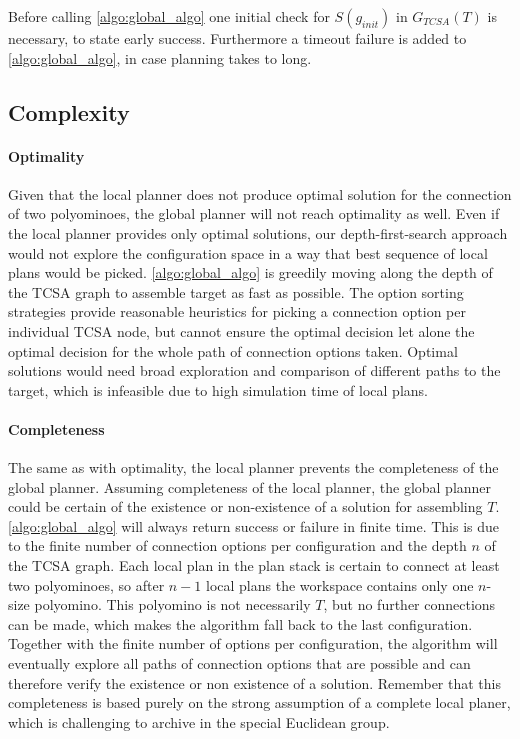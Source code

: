 Before calling \autoref{algo:global_algo} one initial check for $S(g_{init})$ in $G_{TCSA}(T)$ is necessary, to state early success.
Furthermore a timeout failure is added to \autoref{algo:global_algo}, in case planning takes to long.
 
\subsection{Complexity}

\paragraph{Optimality}

Given that the local planner does not produce optimal solution for the connection of two polyominoes, the global planner will not reach optimality as well.
Even if the local planner provides only optimal solutions, our depth-first-search approach would not explore the configuration space in a way that best sequence of local plans would be picked.
\autoref{algo:global_algo} is greedily moving along the depth of the TCSA graph to assemble target as fast as possible.
The option sorting strategies provide reasonable heuristics for picking a connection option per individual TCSA node, but cannot ensure the optimal decision let alone the optimal decision for the whole path of connection options taken.
Optimal solutions would need broad exploration and comparison of different paths to the target, which is infeasible due to high simulation time of local plans.

\paragraph{Completeness}

The same as with optimality, the local planner prevents the completeness of the global planner.
Assuming completeness of the local planner, the global planner could be certain of the existence or non-existence of a solution for assembling $T$.
\autoref{algo:global_algo} will always return success or failure in finite time.
This is due to the finite number of connection options per configuration and the depth $n$ of the TCSA graph.
Each local plan in the plan stack is certain to connect at least two polyominoes, so after $n-1$ local plans the workspace contains only one $n$-size polyomino.
This polyomino is not necessarily $T$, but no further connections can be made, which makes the algorithm fall back to the last configuration.
Together with the finite number of options per configuration, the algorithm will eventually explore all paths of connection options that are possible and can therefore verify the existence or non existence of a solution.
Remember that this completeness is based purely on the strong assumption of a complete local planer, which is challenging to archive in the special Euclidean group.

